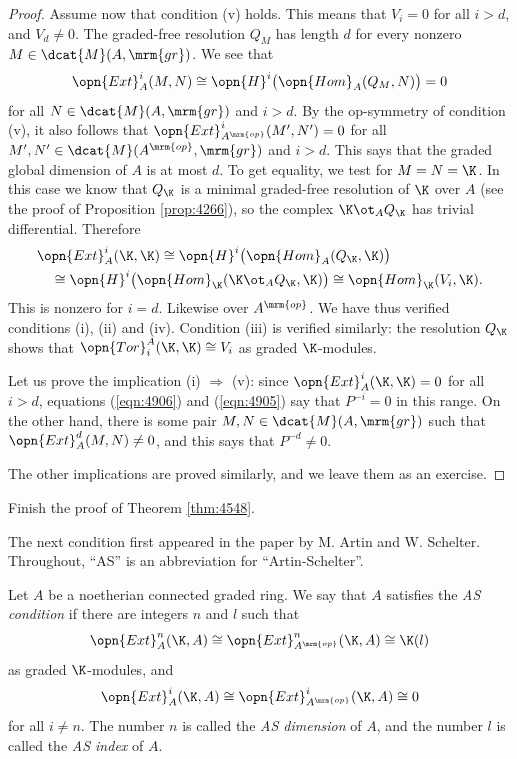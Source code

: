 \begin{proof}
Assume now that condition (v) holds. This means that 
$V_{i} = 0$ for all $i > d$, and $V_{d} \neq 0$.
The graded-free resolution $Q_M$ has 
length $d$ for every nonzero $M \in \dcat{M}(A, \mrm{gr})$.
We see that  
\[  \opn{Ext}^i_A(M, N) \cong \opn{H}^i \bigl( \opn{Hom}_A(Q_M, N) \bigr)
= 0 \]
for all $N \in  \dcat{M}(A, \mrm{gr})$ and $i > d$. By the op-symmetry 
of condition (v), it also follows that 
$\opn{Ext}^i_{A^{\mrm{op}}}(M', N') = 0$
for all $M', N' \in  \dcat{M}(A^{\mrm{op}}, \mrm{gr})$ and $i > d$.
This says that the graded global dimension of $A$ is at most $d$. 
To get equality, we test for $M = N = \K$. 
In this case we know that $Q_{\K}$ is a minimal graded-free resolution of 
$\K$ over $A$ (see the proof of Proposition \ref{prop:4266}), so the complex 
$\K \ot_A Q_{\K}$ has trivial differential. Therefore
\begin{equation} \label{eqn:4906}
\begin{aligned}
&
\opn{Ext}^i_A(\K, \K) \cong 
\opn{H}^i \bigl( \opn{Hom}_A(Q_{\K}, \K) \bigr)
\\ & \quad 
\cong \opn{H}^i \bigl( \opn{Hom}_{\K}(\K \ot_A Q_{\K}, \K) \bigr) \cong 
\opn{Hom}_{\K}(V_{i}, \K) . 
\end{aligned}
\end{equation}
This is nonzero for $i = d$. 
Likewise over $A^{\mrm{op}}$. 
We have thus verified conditions (i), (ii) and (iv). 
Condition (iii) is verified similarly: the resolution $Q_{\K}$ shows that 
$\opn{Tor}_i^A(\K, \K) \cong V_{i}$
as graded $\K$-modules.

Let us prove the implication (i) $\Rightarrow$ (v):  since  
$\opn{Ext}^i_A(\K, \K) = 0$
for all $i > d$, equations (\ref{eqn:4906}) and (\ref{eqn:4905}) say that 
$P^{-i} = 0$ in this range. On the other hand, there is some pair 
$M, N \in \dcat{M}(A, \mrm{gr})$ such 
that $\opn{Ext}^d_A(M, N) \neq 0$, and this says that $P^{-d} \neq 0$.

The other implications are proved similarly, and we leave them as an exercise. 
\end{proof}

\begin{exer} \label{exer:4550}
Finish the proof of Theorem \ref{thm:4548}.
\end{exer}

The next condition first appeared in the paper \cite{ArSchl} by M. Artin and 
W. Schelter. Throughout, ``AS'' is an abbreviation for ``Artin-Schelter''.  

\begin{dfn} \label{dfn:4545}
Let $A$ be a noetherian connected graded ring. We say that $A$ satisfies the 
{\em AS condition}%
if there are integers $n$ and $l$ such that 
\[ \opn{Ext}^n_A(\K, A) \cong \opn{Ext}^n_{A^{\mrm{op}}}(\K, A) 
\cong \K(l) \]
as graded $\K$-modules, and  
\[ \opn{Ext}^i_A(\K, A) \cong \opn{Ext}^i_{A^{\mrm{op}}}(\K, A) \cong 0 \]
for all $i \neq n$.
The number $n$ is called the {\em AS dimension} of $A$, and the 
number $l$ is called the {\em AS index} of $A$.
\end{dfn}
 
